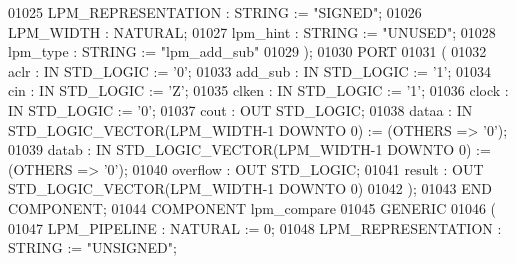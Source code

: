\begin{DoxyCode}
{01025         LPM\_REPRESENTATION  :   \textcolor{comment}{STRING} := \textcolor{keyword}{"SIGNED"};
01026         LPM\_WIDTH   :   \textcolor{comment}{NATURAL};
01027         lpm\_hint    :   \textcolor{comment}{STRING} := \textcolor{keyword}{"UNUSED"};
01028         lpm\_type    :   \textcolor{comment}{STRING} := \textcolor{keyword}{"lpm\_add\_sub"}
01029      );
01030      \textcolor{keywordflow}{PORT}
01031      ( 
01032         aclr    :   \textcolor{keywordflow}{IN} \textcolor{comment}{STD\_LOGIC} := '\textcolor{vhdllogic}{}\textcolor{vhdllogic}{0}';
01033         add\_sub :   \textcolor{keywordflow}{IN} \textcolor{comment}{STD\_LOGIC} := '\textcolor{vhdllogic}{}\textcolor{vhdllogic}{1}';
01034         cin :   \textcolor{keywordflow}{IN} \textcolor{comment}{STD\_LOGIC} := 'Z';
01035         clken   :   \textcolor{keywordflow}{IN} \textcolor{comment}{STD\_LOGIC} := '\textcolor{vhdllogic}{}\textcolor{vhdllogic}{1}';
01036         clock   :   \textcolor{keywordflow}{IN} \textcolor{comment}{STD\_LOGIC} := '\textcolor{vhdllogic}{}\textcolor{vhdllogic}{0}';
01037         cout    :   \textcolor{keywordflow}{OUT} \textcolor{comment}{STD\_LOGIC};
01038         dataa   :   \textcolor{keywordflow}{IN} \textcolor{comment}{STD\_LOGIC\_VECTOR}(LPM\_WIDTH\textcolor{vhdlchar}{-}\textcolor{vhdllogic}{}\textcolor{vhdllogic}{1} \textcolor{keywordflow}{DOWNTO} \textcolor{vhdllogic}{}\textcolor{vhdllogic}{0}) := (\textcolor{keywordflow}{OTHERS} => '\textcolor{vhdllogic}{}\textcolor{vhdllogic}{0}');
01039         datab   :   \textcolor{keywordflow}{IN} \textcolor{comment}{STD\_LOGIC\_VECTOR}(LPM\_WIDTH\textcolor{vhdlchar}{-}\textcolor{vhdllogic}{}\textcolor{vhdllogic}{1} \textcolor{keywordflow}{DOWNTO} \textcolor{vhdllogic}{}\textcolor{vhdllogic}{0}) := (\textcolor{keywordflow}{OTHERS} => '\textcolor{vhdllogic}{}\textcolor{vhdllogic}{0}');
01040         overflow    :   \textcolor{keywordflow}{OUT} \textcolor{comment}{STD\_LOGIC};
01041         result  :   \textcolor{keywordflow}{OUT} \textcolor{comment}{STD\_LOGIC\_VECTOR}(LPM\_WIDTH\textcolor{vhdlchar}{-}\textcolor{vhdllogic}{}\textcolor{vhdllogic}{1} \textcolor{keywordflow}{DOWNTO} \textcolor{vhdllogic}{}\textcolor{vhdllogic}{0})
01042      ); 
01043      \textcolor{keywordflow}{END} \textcolor{keywordflow}{COMPONENT};
01044      \textcolor{keywordflow}{COMPONENT}  lpm\_compare
01045      \textcolor{keywordflow}{GENERIC} 
01046      (
01047         LPM\_PIPELINE    :   \textcolor{comment}{NATURAL} := \textcolor{vhdllogic}{}\textcolor{vhdllogic}{0};
01048         LPM\_REPRESENTATION  :   \textcolor{comment}{STRING} := \textcolor{keyword}{"UNSIGNED"};
}
\end{DoxyCode}
